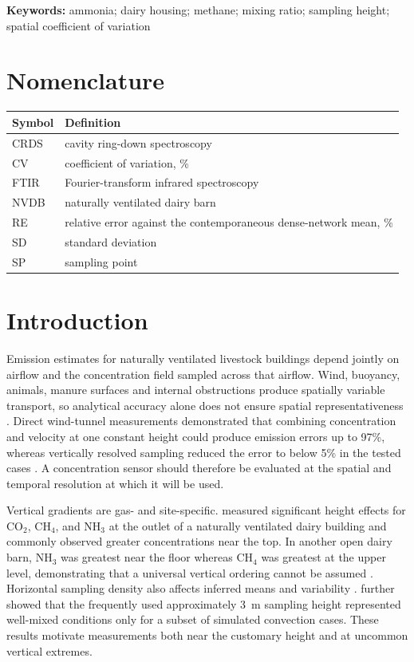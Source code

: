﻿\documentclass[12pt,a4paper]{article}
\begin{document}
\noindent\textbf{Keywords:} ammonia; dairy housing; methane; mixing ratio; sampling height; spatial coefficient of variation

\section*{Nomenclature}
\begin{tabular}{>{\raggedright\arraybackslash}p{2.2cm}>{\raggedright\arraybackslash}p{10.8cm}}
\toprule Symbol & Definition\\ \midrule
CRDS & cavity ring-down spectroscopy\\
CV & coefficient of variation, \%\\
FTIR & Fourier-transform infrared spectroscopy\\
NVDB & naturally ventilated dairy barn\\
RE & relative error against the contemporaneous dense-network mean, \%\\
SD & standard deviation\\
SP & sampling point\\ \bottomrule
\end{tabular}

\iffalse
\section{Introduction}
Emission estimates for naturally ventilated livestock buildings depend jointly on airflow and the concentration field sampled across that airflow. Wind, buoyancy, animals, manure surfaces and internal obstructions produce spatially variable transport, so analytical accuracy alone does not ensure spatial representativeness \citep{Calvet2013,Ogink2013}. Direct wind-tunnel measurements demonstrated that combining concentration and velocity at one constant height could produce emission errors up to 97\%, whereas vertically resolved sampling reduced the error to below 5\% in the tested cases \citep{Janke2020}. A concentration sensor should therefore be evaluated at the spatial and temporal resolution at which it will be used.

Vertical gradients are gas- and site-specific. \citet{Sahu2023} measured significant height effects for \(\mathrm{CO_2}\), \(\mathrm{CH_4}\), and \(\mathrm{NH_3}\) at the outlet of a naturally ventilated dairy building and commonly observed greater concentrations near the top. In another open dairy barn, \(\mathrm{NH_3}\) was greatest near the floor whereas \(\mathrm{CH_4}\) was greatest at the upper level, demonstrating that a universal vertical ordering cannot be assumed \citep{Durso2024}. Horizontal sampling density also affects inferred means and variability \citep{Durso2022,DeVogeleer2017}. \citet{Doumbia2021} further showed that the frequently used approximately \SI{3}{m} sampling height represented well-mixed conditions only for a subset of simulated convection cases. These results motivate measurements both near the customary height and at uncommon vertical extremes.
\end{document}
